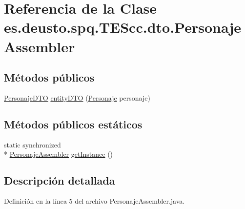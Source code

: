 \hypertarget{classes_1_1deusto_1_1spq_1_1_t_e_scc_1_1dto_1_1_personaje_assembler}{\section{Referencia de la Clase es.\+deusto.\+spq.\+T\+E\+Scc.\+dto.\+Personaje\+Assembler}
\label{classes_1_1deusto_1_1spq_1_1_t_e_scc_1_1dto_1_1_personaje_assembler}
}
\subsection*{Métodos públicos}
\begin{DoxyCompactItemize}
\item 
\hyperlink{classes_1_1deusto_1_1spq_1_1_t_e_scc_1_1dto_1_1_personaje_d_t_o}{Personaje\+D\+T\+O} \hyperlink{classes_1_1deusto_1_1spq_1_1_t_e_scc_1_1dto_1_1_personaje_assembler_a1ad6d235c49479e8b9aa592f642a4292}{entity\+D\+T\+O} (\hyperlink{classes_1_1deusto_1_1spq_1_1_t_e_scc_1_1servidor_1_1jdo_1_1_personaje}{Personaje} personaje)
\end{DoxyCompactItemize}
\subsection*{Métodos públicos estáticos}
\begin{DoxyCompactItemize}
\item 
static synchronized \\*
\hyperlink{classes_1_1deusto_1_1spq_1_1_t_e_scc_1_1dto_1_1_personaje_assembler}{Personaje\+Assembler} \hyperlink{classes_1_1deusto_1_1spq_1_1_t_e_scc_1_1dto_1_1_personaje_assembler_ad852064342cbff8cb501d52f04bd7060}{get\+Instance} ()
\end{DoxyCompactItemize}


\subsection{Descripción detallada}


Definición en la línea 5 del archivo Personaje\+Assembler.\+java.



